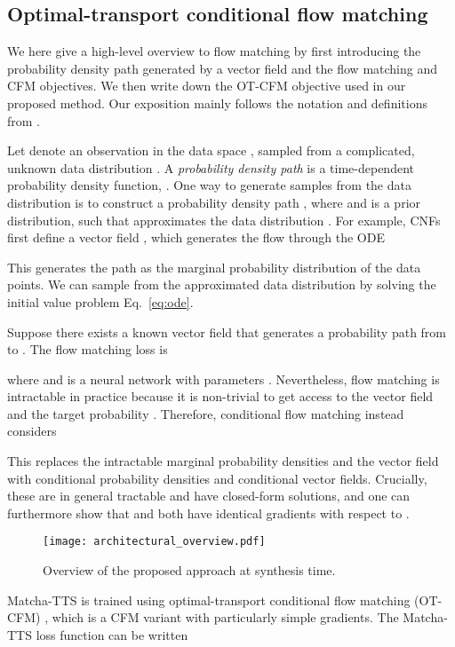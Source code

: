 \documentclass[british]{article}
\begin{document}
\subsection{Optimal-transport conditional flow matching}
\label{ssec:cfm}
We here give a high-level overview to flow matching by first introducing the probability density path generated by a vector field and the flow matching and CFM objectives.
We then write down the OT-CFM objective used in our proposed method.
Our exposition mainly follows the notation and definitions from \cite{lipman2023flow}.

Let 
 denote an observation in the data space , sampled from a complicated, unknown data distribution . 
A \emph{probability density path} is a time-dependent probability density function, .
One way to generate samples from the data distribution  is to construct a probability density path , where  and  is a prior distribution, such that  approximates the data distribution .
For example, CNFs first define a vector field , which generates the flow  through the ODE 

This generates the path  as the marginal probability distribution of the data points.
We can sample from the approximated data distribution  by solving the initial value problem Eq.\ \eqref{eq:ode}. 




Suppose there exists a known vector field  that generates a probability path  from  to .
The flow matching loss is

where  and  is a neural network with parameters .
Nevertheless, flow matching is intractable in practice because it is non-trivial to get access to the vector field  and the target probability .
Therefore, conditional flow matching instead considers

This replaces the intractable marginal probability densities and the vector field with conditional probability densities and conditional vector fields. Crucially, these are in general tractable and have closed-form solutions, and one can furthermore show that  and  both have identical gradients with respect to  \cite{lipman2023flow}.
\begin{figure}[!t]
\centering
\texttt{[image: architectural\_overview.pdf]}
\caption{Overview of the proposed approach at synthesis time.}
\label{fig: model architecture overview}
\vspace{-\baselineskip}
\end{figure}

Matcha-TTS is trained using optimal-transport conditional flow matching (OT-CFM) \cite{lipman2023flow}, which is a CFM variant with particularly simple gradients.
The Matcha-TTS loss function can be written
\end{document}
